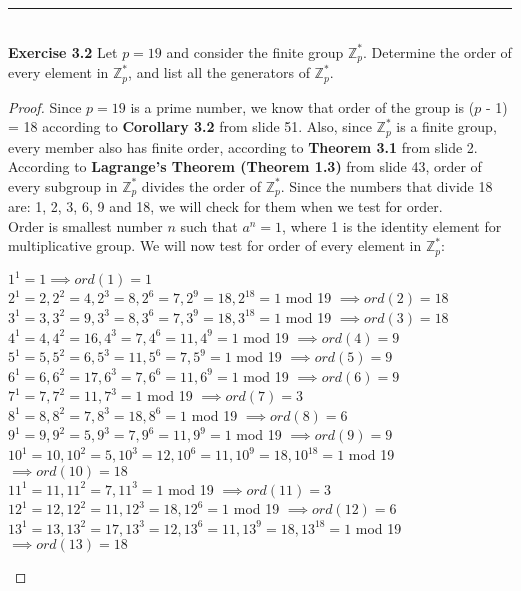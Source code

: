 \documentclass{article}
\begin{document}
\noindent\rule{12cm}{0.4pt}\\
\noindent \textbf{Exercise 3.2} Let $p = 19$ and consider the finite group $\mathbb{Z}^{*}_{p}$. Determine the order of every element in $\mathbb{Z}^{*}_{p}$, and list all the generators of $\mathbb{Z}^{*}_{p}$.
\begin{proof}
Since $p=19$ is a prime number, we know that order of the group is ($p$ - 1) = 18 according to \textbf{Corollary 3.2} from slide 51. Also, since $\mathbb{Z}^{*}_{p}$ is a finite group, every member also has finite order, according to \textbf{Theorem 3.1} from slide 2. According to \textbf{Lagrange's Theorem (Theorem 1.3)} from slide 43, order of every subgroup in $\mathbb{Z}^{*}_{p}$ divides the order of $\mathbb{Z}^{*}_{p}$. Since the numbers that divide 18 are: 1, 2, 3, 6, 9 and 18, we will check for them when we test for order.\\
Order is smallest number $n$ such that $a^n=1$, where 1 is the identity element for multiplicative group. We will now test for order of every element in $\mathbb{Z}^{*}_{p}$:\\
\begin{center}
$1^1 = 1 \implies ord(1) = 1$\\
$2^1 = 2, 2^2 = 4, 2^3 = 8, 2^6 = 7, 2^9 = 18, 2^{18} = 1$ mod 19 $\implies ord(2) = 18$\\
$3^1 = 3, 3^2 = 9, 3^3 = 8, 3^6 = 7, 3^9 = 18, 3^{18} = 1$ mod 19 $\implies ord(3) = 18$\\
$4^1 = 4, 4^2 = 16, 4^3 = 7, 4^6 = 11, 4^9 = 1$ mod 19 $\implies ord(4) = 9$\\
$5^1 = 5, 5^2 = 6, 5^3 = 11, 5^6 = 7, 5^9 = 1$ mod 19 $\implies ord(5) = 9$\\
$6^1 = 6, 6^2 = 17, 6^3 = 7, 6^6 = 11, 6^9 = 1$ mod 19 $\implies ord(6) = 9$\\
$7^1 = 7, 7^2 = 11, 7^3 = 1$ mod 19 $\implies ord(7) = 3$\\
$8^1 = 8, 8^2 = 7, 8^3 = 18, 8^6 = 1$ mod 19 $\implies ord(8) = 6$\\
$9^1 = 9, 9^2 = 5, 9^3 = 7, 9^6 = 11, 9^9 = 1$ mod 19 $\implies ord(9) = 9$\\
$10^1 = 10, 10^2 = 5, 10^3 = 12, 10^6 = 11, 10^9 = 18, 10^{18} = 1$ mod 19 $\implies ord(10) = 18$\\
$11^1 = 11, 11^2 = 7, 11^3 = 1$ mod 19 $\implies ord(11) = 3$\\
$12^1 = 12, 12^2 = 11, 12^3 = 18, 12^6 = 1$ mod 19 $\implies ord(12) = 6$\\
$13^1 = 13, 13^2 = 17, 13^3 = 12, 13^6 = 11, 13^9 = 18, 13^{18} = 1$ mod 19 $\implies ord(13) = 18$\\

\end{center}
\end{proof}
\end{document}
